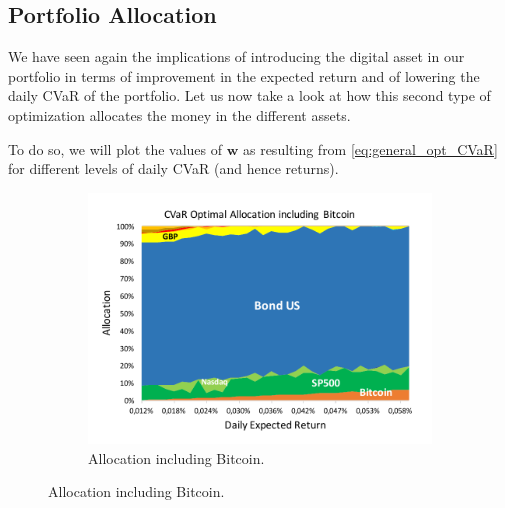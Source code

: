\subsection{Portfolio Allocation}
We have seen again the implications of introducing the digital asset in our portfolio in terms of improvement in the expected return and of lowering the daily CVaR of the portfolio.
Let us now take a look at how this second type of optimization allocates the money in the different assets.

To do so, we will plot the values of $\mathbf{w}$ as resulting from \eqref{eq:general_opt_CVaR} for different levels of daily CVaR (and hence returns).


\begin{figure}
	\centering
	\begin{subfigure}{0.8\textwidth}
		\includegraphics[width=\linewidth]{Images/cvar_allocation}
		\caption{Allocation including Bitcoin.}
	\end{subfigure}
	

\end{figure}
